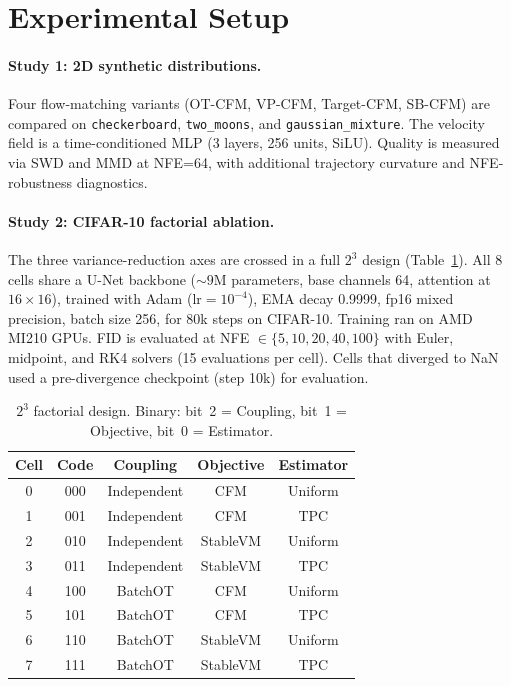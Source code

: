 \section{Experimental Setup}
\label{sec:methodology}

\paragraph{Study 1: 2D synthetic distributions.} Four flow-matching variants (OT-CFM, VP-CFM, Target-CFM, SB-CFM) are compared on \texttt{checkerboard}, \texttt{two\_moons}, and \texttt{gaussian\_mixture}. The velocity field is a time-conditioned MLP (3 layers, 256 units, SiLU). Quality is measured via SWD and MMD at NFE=64, with additional trajectory curvature and NFE-robustness diagnostics.

\paragraph{Study 2: CIFAR-10 factorial ablation.} The three variance-reduction axes are crossed in a full $2^3$ design (Table~\ref{tab:cells}). All 8 cells share a U-Net backbone (${\sim}9$M parameters, base channels 64, attention at $16{\times}16$), trained with Adam ($\text{lr}{=}10^{-4}$), EMA decay 0.9999, fp16 mixed precision, batch size 256, for 80k steps on CIFAR-10. Training ran on AMD MI210 GPUs. FID \citep{heusel2017gans} is evaluated at NFE $\in \{5,10,20,40,100\}$ with Euler, midpoint, and RK4 solvers (15 evaluations per cell). Cells that diverged to NaN used a pre-divergence checkpoint (step 10k) for evaluation.

\begin{table}[H]
\centering
\caption{$2^3$ factorial design. Binary: bit~2 = Coupling, bit~1 = Objective, bit~0 = Estimator.}
\label{tab:cells}
\small
\begin{tabular}{@{}ccccc@{}}
\toprule
Cell & Code & Coupling & Objective & Estimator \\
\midrule
0 & 000 & Independent & CFM & Uniform \\
1 & 001 & Independent & CFM & TPC \\
2 & 010 & Independent & StableVM & Uniform \\
3 & 011 & Independent & StableVM & TPC \\
4 & 100 & BatchOT & CFM & Uniform \\
5 & 101 & BatchOT & CFM & TPC \\
6 & 110 & BatchOT & StableVM & Uniform \\
7 & 111 & BatchOT & StableVM & TPC \\
\bottomrule
\end{tabular}
\end{table}
